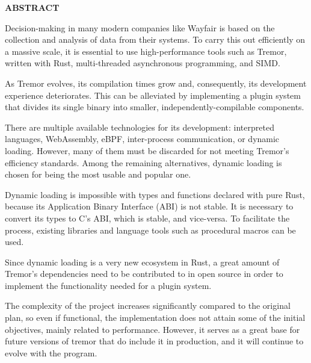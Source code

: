 
\begin{center}
{\LARGE \bfseries ABSTRACT}

\vspace{2.5cm}
\end{center}

Decision-making in many modern companies like Wayfair is based on the collection
and analysis of data from their systems. To carry this out efficiently on a
massive scale, it is essential to use high-performance tools such as Tremor,
written with Rust, multi-threaded asynchronous programming, and SIMD.

As Tremor evolves, its compilation times grow and, consequently, its development
experience deteriorates. This can be alleviated by implementing a plugin system
that divides its single binary into smaller, independently-compilable
components.

There are multiple available technologies for its development: interpreted
languages, WebAssembly, eBPF, inter-process communication, or dynamic loading.
However, many of them must be discarded for not meeting Tremor's efficiency
standards. Among the remaining alternatives, dynamic loading is chosen for being
the most usable and popular one.

Dynamic loading is impossible with types and functions declared with pure Rust,
because its Application Binary Interface (ABI) is not stable. It is necessary to
convert its types to C's ABI, which is stable, and vice-versa. To facilitate the
process, existing libraries and language tools such as procedural macros can be
used.

Since dynamic loading is a very new ecosystem in Rust, a great amount of
Tremor's dependencies need to be contributed to in open source in order to
implement the functionality needed for a plugin system.

The complexity of the project increases significantly compared to the original
plan, so even if functional, the implementation does not attain some of the
initial objectives, mainly related to performance. However, it serves as a great
base for future versions of tremor that do include it in production, and it will
continue to evolve with the program.
